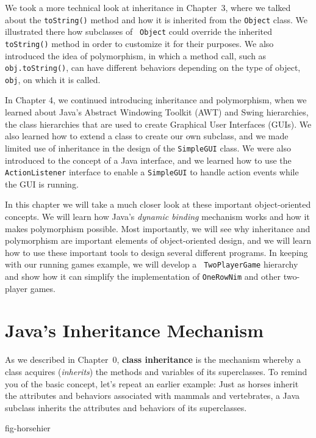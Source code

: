 We took a more technical look at inheritance in Chapter~3, where we
talked about the {\tt toString()} method and how it is inherited from
the {\tt Object} class. We illustrated there how subclasses of {\tt
Object} could override the inherited {\tt toString()} method in order
to customize it for their purposes. We also introduced the idea of
polymorphism, in which a method call, such as {\tt obj.toString()},
can have different behaviors depending on the type of object, {\tt
obj}, on which it is called.

In Chapter 4, we continued introducing inheritance and polymorphism,
when we learned about Java's Abstract Windowing Toolkit (AWT) and
Swing hierarchies, the class hierarchies that are used to create
Graphical User Interfaces (GUIs).  We also learned how to extend a
class to create our own subclass, and we made limited use of
inheritance in the design of the {\tt SimpleGUI} class.  We were also
introduced to the concept of a Java interface, and we learned how to
use the {\tt ActionListener} interface to enable a {\tt SimpleGUI} to
handle action events while the GUI is running.

In this chapter we will take a much closer look at these important
object-oriented concepts.  We will learn how Java's {\em dynamic
binding} mechanism works and how it makes polymorphism possible.  Most
importantly, we will see why inheritance and polymorphism are
important elements of object-oriented design, and we will learn how to
use these important tools to design several different programs.  In
keeping with our running games example, we will develop a {\tt
TwoPlayerGame} hierarchy and show how it can simplify the
implementation of {\tt OneRowNim} and other two-player games.

\section{Java's Inheritance Mechanism}

As we described in Chapter~0, {\bf class inheritance} is the mechanism
whereby a class acquires ({\em inherits}) the methods and variables of
its superclasses.  To remind you of the basic concept, let's repeat an
earlier example: Just as horses inherit the attributes and behaviors
associated with mammals and vertebrates, a Java subclass inherits the
attributes and behaviors of its superclasses.

{fig-horsehier}

